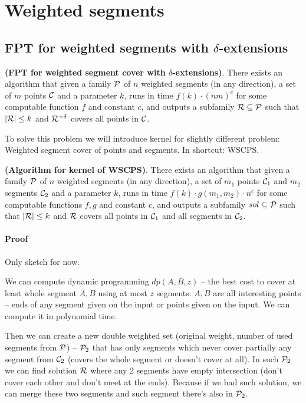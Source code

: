 \section{Weighted segments}
\subsection{FPT for weighted segments with $\delta$-extensions}
\begin{tw}{
	\textbf{(FPT for weighted segment cover with $\delta$-extensions)}.
	There exists an algorithm that given a family $\mathcal{P}$ of
	$n$ weighted segments (in any direction),
	a set of $m$ points $\mathcal{C}$
	and a parameter $k$,
	runs in time $f(k) \cdot (nm)^c$ for some computable function $f$ and constant $c$,
	and outputs a subfamily $\mathcal{R} \subseteq \mathcal{P}$
	such that $|\mathcal{R}| \le k$ and $\mathcal{R}^{+\delta}$ covers all points in $\mathcal{C}$.
}\end{tw}

To solve this problem we will introduce kernel for slightly different
problem: Weighted segment cover of points and segments.
In shortcut: WSCPS.

\begin{lemma}
	\textbf{(Algorithm for kernel of WSCPS)}.
	There exists an algorithm that given a family $\mathcal{P}$ of
	$n$ weighted segments (in any direction),
	a set of $m_1$ points $\mathcal{C}_1$ and $m_2$ segments $\mathcal{C}_2$
	and a parameter $k$,
	runs in time $f(k) \cdot g(m_1, m_2) \cdot n^c$ for some computable functions $f, g$ and constant $c$,
	and outputs a subfamily $sol \subseteq \mathcal{P}$
	such that $|\mathcal{R}| \le k$ and $\mathcal{R}$ covers all points in $\mathcal{C}_1$ and all segments in $\mathcal{C}_2$. 
\end{lemma}
\paragraph{Proof}
Only sketch for now.

We can compute dynamic programming $dp(A, B, z)$ --
the best cost to cover at least whole segment $A, B$
using at most $z$ segments.
$A, B$ are all interesting points -- ends of any segment given on the input or points given on the input.
We can compute it in polynomial time.

Then we can create a new double weighted set (original weight,
number of used segments from $\mathcal{P}$) -- $\mathcal{P}_2$
that has only segments which never cover partially any segment from $\mathcal{C}_2$
(covers the whole segment or doesn't cover at all).
In such $\mathcal{P}_2$ we can find solution $\mathcal{R}$ where any 2 segments
have empty intersection (don't cover each other and don't meet at the ends).
Because if we had such solution, we can merge these two segments and
such segment there's also in $\mathcal{P}_2$.

